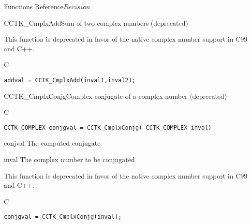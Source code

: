\begin{cactuspart}{ Functions Reference}{}{$Revision$}
\begin{FunctionDescription}{CCTK\_CmplxAdd}{Sum of two complex numbers (deprecated)}
\begin{Discussion}
This function is deprecated in favor of the native complex number support in
C99 and C++.
\end{Discussion}
\begin{ExampleSection}
\begin{Example}{C}
\begin{verbatim}
addval = CCTK_CmplxAdd(inval1,inval2);
\end{verbatim}
\end{Example}
\end{ExampleSection}
\end{FunctionDescription}

\begin{FunctionDescription}{CCTK\_CmplxConjg}{Complex conjugate of a complex number (deprecated)}
\label{CCTK-CmplxConjg}
\begin{SynopsisSection}
\begin{Synopsis}{C}
\begin{verbatim}CCTK_COMPLEX conjgval = CCTK_CmplxConjg( CCTK_COMPLEX inval)\end{verbatim}
\end{Synopsis}
\end{SynopsisSection}
\begin{ParameterSection}
\begin{Parameter}{conjval}
The computed conjugate
\end{Parameter}
\begin{Parameter}{inval}
The complex number to be conjugated
\end{Parameter}
\end{ParameterSection}

\begin{Discussion}
This function is deprecated in favor of the native complex number support in
C99 and C++.
\end{Discussion}
\begin{ExampleSection}
\begin{Example}{C}
\begin{verbatim}
conjgval = CCTK_CmplxConjg(inval);
\end{verbatim}
\end{Example}
\end{ExampleSection}
\end{FunctionDescription}


\end{cactuspart}
